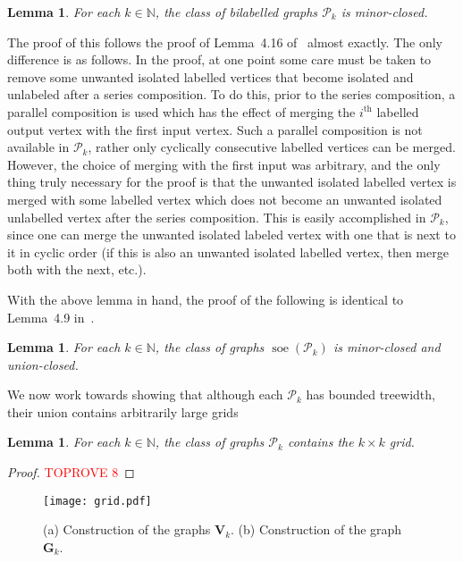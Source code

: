 \documentclass[11pt,a4paper]{article}
\theoremstyle{plain}
\newtheorem{lem}[thm]{Lemma}
\theoremstyle{remark}
\theoremstyle{definition}
\DeclareMathOperator{\soe}{soe}
\def\calP{{\mathcal P}} \def\calQ{{\mathcal Q}} \def\calR{{\mathcal R}}
\begin{document}
\begin{lem}\label{lem:minor-closedbl}
    For each $k \in \mathbb{N}$, the class of bilabelled graphs $\calP_k$ is minor-closed. 
\end{lem}
The proof of this follows the proof of Lemma~4.16 of~\cite{roberson-seppelt-arxiv} almost exactly. The only difference is as follows. In the proof, at one point some care must be taken to remove some unwanted isolated labelled vertices that become isolated and unlabeled after a series composition. To do this, prior to the series composition, a parallel composition is used which has the effect of merging the $i^\text{th}$ labelled output vertex with the first input vertex. Such a parallel composition is not available in $\calP_k$, rather only cyclically consecutive labelled vertices can be merged. However, the choice of merging with the first input was arbitrary, and the only thing truly necessary for the proof is that the unwanted isolated labelled vertex is merged with some labelled vertex which does not become an unwanted isolated unlabelled vertex after the series composition. This is easily accomplished in $\calP_k$, since one can merge the unwanted isolated labeled vertex with one that is next to it in cyclic order (if this is also an unwanted isolated labelled vertex, then merge both with the next, etc.).

With the above lemma in hand, the proof of the following is identical to Lemma~4.9 in~\cite{roberson-seppelt-arxiv}.

\begin{lem}\label{lem:minor-closed}
    For each $k \in \mathbb{N}$, the class of graphs $\soe(\calP_k)$ is minor-closed and union-closed. 
\end{lem}










We now work towards showing that although each $\calP_k$ has bounded treewidth, their union contains arbitrarily large grids  

\begin{lem}\label{lem:unbounded-tw}
     For each $k \in \mathbb{N}$, the class of graphs $\calP_k$ contains the $k \times k$ grid.   
\end{lem}
\begin{proof}\textcolor{red}{TOPROVE 8}\end{proof}

\begin{figure}[b]
  \centering
  \texttt{[image: grid.pdf]}
  \caption{(a) Construction of the graphs $\boldsymbol{V}_k$. (b) Construction of the graph $\boldsymbol{G}_k$.}
  \label{fig:grid}
\end{figure}
\end{document}
